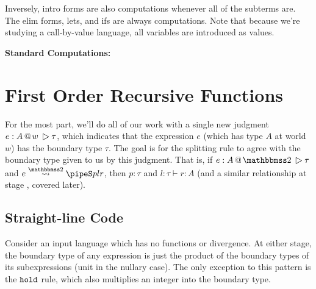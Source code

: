 \documentclass[]{article}
\newcommand {\next}{asdlfkj}
\begin{document}
\begin{abstrsyn}
Inversely, intro forms are also computations whenever all of the subterms are.
The elim forms, lets, and ifs are always computations.
Note that because we're studying a call-by-value language, all variables are introduced as values.

\begin{framed}
\noindent\textbf{Standard Computations:}
\end{framed}

\section{First Order Recursive Functions}
\label{sec:firstorder}

For the most part, we'll do all of our work with a single new judgment \mbox{$\btj e A w \tau$}, 
which indicates that the expression $e$ (which has type $A$ at world $w$) has the boundary type $\tau$.
The goal is for the splitting rule to agree with the boundary type given to us by this judgment.
That is, if $\btj e A \bbtwo \tau$ and $\splittwo{e}{A}{p}{l}{r}$, 
then $p:\tau$ and $l:\tau \vdash r:A$ (and a similar relationship at stage \bbone, covered later).

\subsection{Straight-line Code}

Consider an input language which has no functions or divergence.
At either stage, the boundary type of any expression is 
just the product of the boundary types of its subexpressions
(unit in the nullary case).
The only exception to this pattern is the ${\tt hold}$ rule,
which also multiplies an integer into the boundary type.



\end{abstrsyn}
\end{document}

